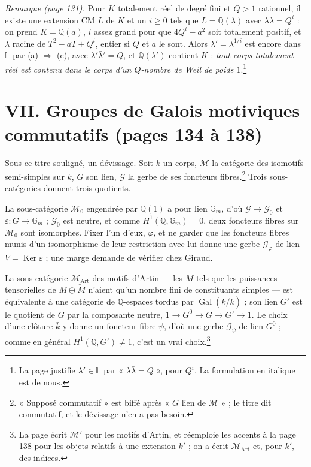 \documentclass[11pt,a4paper]{article}
\begin{document}
\emph{Remarque (page 131).} Pour $K$ totalement réel de degré fini et $Q > 1$
rationnel, il existe une extension CM $L$ de $K$ et un $i \geqslant 0$ tels que
$L = \mathbb{Q}(\lambda)$ avec $\lambda\bar{\lambda} = Q^{i}$ : on prend $K =
\mathbb{Q}(a)$, $i$ assez grand pour que $4Q^{i} - a^{2}$ soit totalement
positif, et $\lambda$ racine de $T^{2} - aT + Q^{i}$, entier si $Q$ et $a$ le sont.
Alors $\lambda' = \lambda^{1/i}$ est encore dans $\mathbb{L}$ par (a)
$\Rightarrow$ (c), avec $\lambda'\bar{\lambda}' = Q$, et $\mathbb{Q}(\lambda')$
contient $K$ : \emph{tout corps totalement réel est contenu dans le corps d'un
$Q$-nombre de Weil de poids $1$}.\footnote{La page justifie $\lambda' \in
\mathbb{L}$ par « $\lambda\bar{\lambda} = Q$ », pour $Q^{i}$. La formulation en
italique est de nous.}

\section*{VII. Groupes de Galois motiviques commutatifs (pages 134 à 138)}

Sous ce titre souligné, un dévissage. Soit $k$ un corps, $\mathcal{M}$ la
catégorie des isomotifs semi-simples sur $k$, $G$ son lien, $\mathcal{G}$ la
gerbe de ses foncteurs fibres.\footnote{« Supposé commutatif » est biffé après
« $G$ lien de $\mathcal{M}$ » ; le titre dit commutatif, et le dévissage n'en a
pas besoin.} Trois sous-catégories donnent trois quotients.

La sous-catégorie $\mathcal{M}_{0}$ engendrée par $\mathbb{Q}(1)$ a pour lien
$\mathbb{G}_{m}$, d'où $\mathcal{G} \to \mathcal{G}_{0}$ et $\varepsilon \colon G
\to \mathbb{G}_{m}$ ; $\mathcal{G}_{0}$ est neutre, et comme
$H^{1}(\mathbb{Q}, \mathbb{G}_{m}) = 0$, deux foncteurs fibres sur
$\mathcal{M}_{0}$ sont isomorphes. Fixer l'un d'eux, $\varphi$, et ne garder que
les foncteurs fibres munis d'un isomorphisme de leur restriction avec lui donne
une gerbe $\mathcal{G}_{\varphi}$ de lien $V = \operatorname{Ker}\varepsilon$ ;
une marge demande de vérifier chez Giraud.

La sous-catégorie $\mathcal{M}_{\mathrm{Art}}$ des motifs d'Artin --- les $M$
tels que les puissances tensorielles de $M \oplus \check{M}$ n'aient qu'un nombre
fini de constituants simples --- est équivalente à une catégorie de
$\mathbb{Q}$-espaces tordus par $\operatorname{Gal}(\bar{k}/k)$ ; son lien
$G'$ est le quotient de $G$ par la composante neutre, $1 \to G^{0} \to G \to G'
\to 1$. Le choix d'une clôture $\bar{k}$ y donne un foncteur fibre $\psi$, d'où une
gerbe $\mathcal{G}_{\psi}$ de lien $G^{0}$ ; comme en général
$H^{1}(\mathbb{Q}, G') \neq 1$, c'est un vrai choix.\footnote{La page écrit
$\mathcal{M}'$ pour les motifs d'Artin, et réemploie les accents à la page 138
pour les objets relatifs à une extension $k'$ ; on a écrit
$\mathcal{M}_{\mathrm{Art}}$ et, pour $k'$, des indices.}
\end{document}
